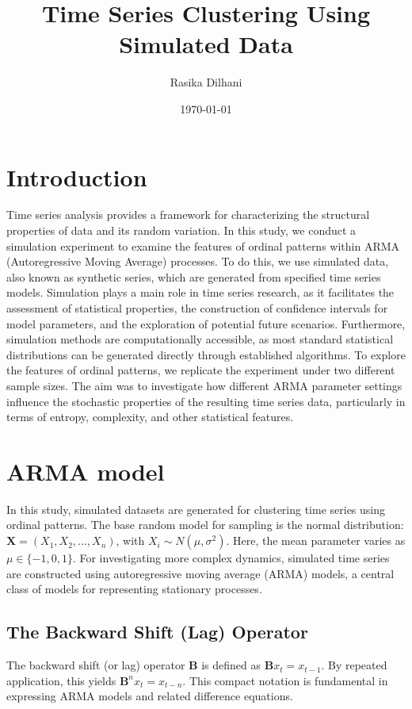 \documentclass[12pt,a4paper]{article}
\title{Time Series Clustering Using Simulated Data}
\author{Rasika Dilhani}
\date{\today}
\begin{document}
	\maketitle
	
\section{Introduction}
Time series analysis provides a framework for characterizing the structural properties of data and its random variation. In this study, we conduct a simulation experiment to examine the features of ordinal patterns within ARMA (Autoregressive Moving Average) processes. To do this, we use simulated data, also known as synthetic series, which are generated from specified time series models. Simulation plays a main role in time series research, as it facilitates the assessment of statistical properties, the construction of confidence intervals for model parameters, and the exploration of potential future scenarios. Furthermore, simulation methods are computationally accessible,  as most standard statistical distributions can be generated directly through established algorithms. To explore the features of ordinal patterns, we replicate the experiment under two different sample sizes. The aim was to investigate how different ARMA parameter settings influence the stochastic properties of the resulting time series data, particularly in terms of entropy, complexity, and other statistical features.

	
\section{ARMA model}
In this study, simulated datasets are generated for clustering time series using ordinal patterns. The base random model for sampling is the normal distribution: $\bm X=(X_1,X_2,\dots,X_n)$, with $X_i \sim N(\mu, \sigma^2)$. Here, the mean parameter varies as $\mu \in \{-1, 0, 1\}$. For investigating more complex dynamics, simulated time series are constructed using autoregressive moving average (ARMA) models, a central class of models for representing stationary processes.

\subsection{The Backward Shift (Lag) Operator}

The backward shift (or lag) operator $\mathbf{B}$ is defined as $\mathbf{B} x_t = x_{t-1}$. By repeated application, this yields $\mathbf{B}^n x_t = x_{t-n}$. This compact notation is fundamental in expressing ARMA models and related difference equations.
\end{document}
